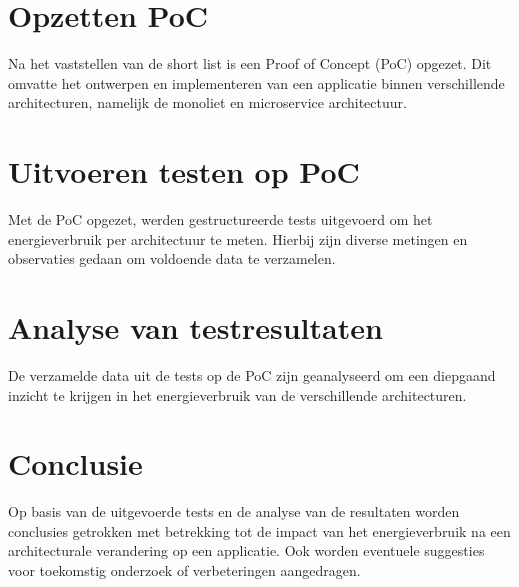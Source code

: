 \section{Opzetten PoC}
Na het vaststellen van de short list is een Proof of Concept (PoC) opgezet. Dit omvatte het ontwerpen en implementeren van een applicatie binnen verschillende architecturen, namelijk de monoliet en microservice architectuur.


\section{Uitvoeren testen op PoC}
Met de PoC opgezet, werden gestructureerde tests uitgevoerd om het energieverbruik per architectuur te meten. Hierbij zijn diverse metingen en observaties gedaan om voldoende data te verzamelen.


\section{Analyse van testresultaten}
De verzamelde data uit de tests op de PoC zijn geanalyseerd om een diepgaand inzicht te krijgen in het energieverbruik van de verschillende architecturen. 

\section{Conclusie}
Op basis van de uitgevoerde tests en de analyse van de resultaten worden conclusies getrokken met betrekking tot de impact van het energieverbruik na een architecturale verandering op een applicatie. Ook worden eventuele suggesties voor toekomstig onderzoek of verbeteringen aangedragen.
